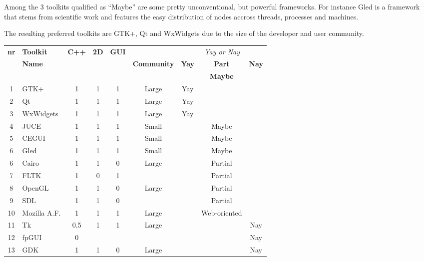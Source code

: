 Among the 3 toolkits qualified as ``Maybe'' are some pretty unconventional, but
powerful frameworks. For instance Gled is a framework that stems from
scientific work and features the easy distribution of nodes accross threads,
processes and machines.

The resulting preferred toolkits are GTK+, Qt and WxWidgets due to the size of
the developer and user community. 

\begin{center}
    \small\sf
    \begin{tabular}{c|lccc|c|ccc}
	\hline
	{\bf nr} & {\bf Toolkit} & {\bf C++} & {\bf 2D} & {\bf GUI} &            & \multicolumn{3}{c}{\em Yay or Nay} \\
	         & {\bf Name}    & 			 &          &            & {\bf Community} 	& {\bf Yay} & {\bf Part} & {\bf Nay} \\
	         &			     &         	 &          &            &         		&           & {\bf Maybe}  &         \\
        \hline
1  &	GTK+		& 1   & 1 & 1 &  Large  & Yay &         &     \\
2  &	Qt	      	& 1   & 1 & 1 &  Large  & Yay &         &     \\
3  &	WxWidgets 	& 1   & 1 & 1 &  Large  & Yay &         &     \\\hline
4  &	JUCE      	& 1   & 1 & 1 &  Small  &     & Maybe   &     \\
5  &	CEGUI     	& 1   & 1 & 1 &  Small  &     & Maybe   &     \\
6  &	Gled		& 1   & 1 & 1 &  Small  &     & Maybe   &     \\
\hline
6  &	Cairo     	& 1   & 1 & 0 &  Large  &     & Partial &     \\
7  &	FLTK      	& 1   & 0 & 1 &         &     & Partial &     \\
8  &	OpenGL 	  	& 1   & 1 & 0 &  Large  &     & Partial &     \\
9  &	SDL		& 1   & 1 & 0 &         &     & Partial &     \\\hline
10 &	Mozilla A.F.  	& 1   & 1 & 1 &  Large  &     & Web-oriented   &     \\\hline
11 &	Tk	        & 0.5 & 1 & 1 &  Large  &     &         & Nay \\
12 &	fpGUI     	& 0   &   &   &         &     &         & Nay \\
13 &	GDK       	& 1   & 1 & 0 &  Large  &     &         & Nay \\
\hline
    \end{tabular}
	\label{tab:compare-main-req}
\end{center}

